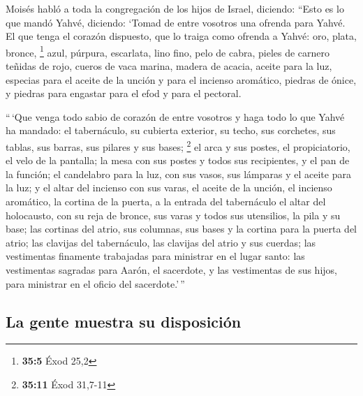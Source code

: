  Moisés habló a toda la congregación de los hijos de
Israel, diciendo: ``Esto es lo que mandó Yahvé, diciendo: 
`Tomad de entre vosotros una ofrenda para Yahvé. El que tenga el corazón
dispuesto, que lo traiga como ofrenda a Yahvé: oro, plata, bronce,
\footnote{\textbf{35:5} Éxod 25,2}  azul, púrpura,
escarlata, lino fino, pelo de cabra,  pieles de carnero
teñidas de rojo, cueros de vaca marina, madera de acacia, 
aceite para la luz, especias para el aceite de la unción y para el
incienso aromático,  piedras de ónice, y piedras para
engastar para el efod y para el pectoral.

 ``\,`Que venga todo sabio de corazón de entre vosotros y
haga todo lo que Yahvé ha mandado:  el tabernáculo, su
cubierta exterior, su techo, sus corchetes, sus tablas, sus barras, sus
pilares y sus bases; \footnote{\textbf{35:11} Éxod 31,7-11}
 el arca y sus postes, el propiciatorio, el velo de la
pantalla;  la mesa con sus postes y todos sus
recipientes, y el pan de la función;  el candelabro para
la luz, con sus vasos, sus lámparas y el aceite para la luz;
 y el altar del incienso con sus varas, el aceite de la
unción, el incienso aromático, la cortina de la puerta, a la entrada del
tabernáculo  el altar del holocausto, con su reja de
bronce, sus varas y todos sus utensilios, la pila y su base;
 las cortinas del atrio, sus columnas, sus bases y la
cortina para la puerta del atrio;  las clavijas del
tabernáculo, las clavijas del atrio y sus cuerdas;  las
vestimentas finamente trabajadas para ministrar en el lugar santo: las
vestimentas sagradas para Aarón, el sacerdote, y las vestimentas de sus
hijos, para ministrar en el oficio del sacerdote.'\,''

\hypertarget{la-gente-muestra-su-disposiciuxf3n}{%
\subsection{La gente muestra su
disposición}\label{la-gente-muestra-su-disposiciuxf3n}}

